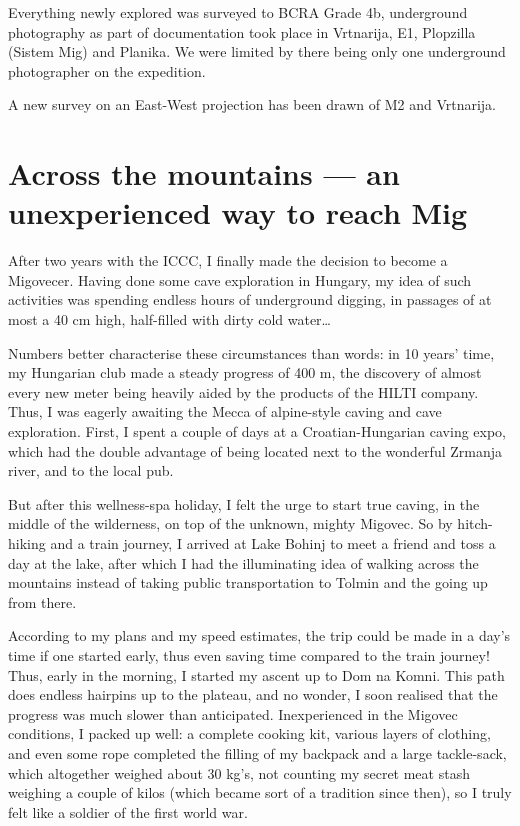 Everything newly explored was surveyed to BCRA Grade 4b, underground
photography as part of documentation took place in Vrtnarija, E1,
Plopzilla (Sistem Mig) and Planika. We were limited by there being only
one underground photographer on the expedition.

A new survey on an East-West projection has been drawn of M2 and
Vrtnarija.


\section{Across the mountains --- an unexperienced way to reach
Mig}\label{across-the-mountains-an-unexperienced-way-to-reach-mig}

After two years with the ICCC, I finally made the decision to become a
Migovecer. Having done some cave exploration in Hungary, my idea of such
activities was spending endless hours of underground digging, in
passages of at most a 40 cm high, half-filled with dirty cold
water\ldots{}

Numbers better characterise these circumstances than words: in 10 years'
time, my Hungarian club made a steady progress of 400 m, the discovery
of almost every new meter being heavily aided by the products of the
HILTI company. Thus, I was eagerly awaiting the Mecca of alpine-style
caving and cave exploration. First, I spent a couple of days at a
Croatian-Hungarian caving expo, which had the double advantage of being
located next to the wonderful Zrmanja river, and to the local pub.

But after this wellness-spa holiday, I felt the urge to start true
caving, in the middle of the wilderness, on top of the unknown, mighty
Migovec. So by hitch-hiking and a train journey, I arrived at Lake
Bohinj to meet a friend and toss a day at the lake, after which I had
the illuminating idea of walking across the mountains instead of taking
public transportation to Tolmin and the going up from there.

According to my plans and my speed estimates, the trip could be made in
a day's time if one started early, thus even saving time compared to the
train journey! Thus, early in the morning, I started my ascent up to Dom
na Komni. This path does endless hairpins up to the plateau, and no
wonder, I soon realised that the progress was much slower than
anticipated. Inexperienced in the Migovec conditions, I packed up well:
a complete cooking kit, various layers of clothing, and even some rope
completed the filling of my backpack and a large tackle-sack, which
altogether weighed about 30 kg's, not counting my secret meat stash
weighing a couple of kilos (which became sort of a tradition since
then), so I truly felt like a soldier of the first world war.

